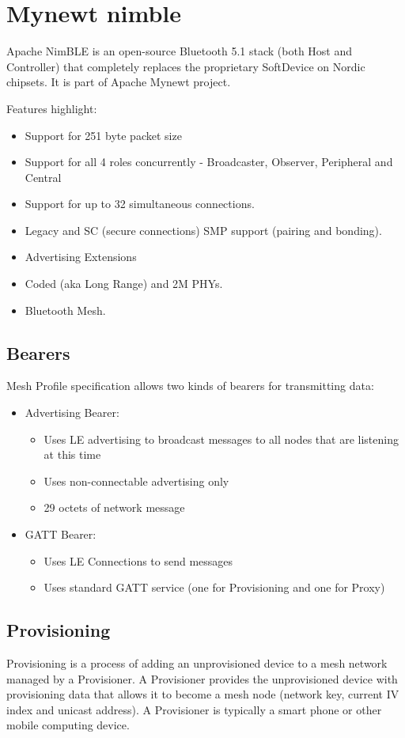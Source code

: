 \documentclass[\main/main.tex]{subfiles}
\begin{document}
\section{Mynewt nimble}
Apache NimBLE is an open-source Bluetooth 5.1 stack (both Host and Controller) that completely replaces the proprietary SoftDevice on Nordic chipsets. It is part of Apache Mynewt project.

Features highlight:
\begin{itemize}
    \item Support for 251 byte packet size
    \item Support for all 4 roles concurrently - Broadcaster, Observer, Peripheral and Central
    \item Support for up to 32 simultaneous connections.
    \item Legacy and SC (secure connections) SMP support (pairing and bonding).
    \item Advertising Extensions
    \item Coded (aka Long Range) and 2M PHYs.
    \item Bluetooth Mesh.
\end{itemize}

\subsection{Bearers}
Mesh Profile specification allows two kinds of bearers for transmitting data:

\begin{itemize}
    \item Advertising Bearer: \begin{itemize}
        \item Uses LE advertising to broadcast messages to all nodes that are listening at this time
        \item Uses non-connectable advertising only
        \item 29 octets of network message
    \end{itemize}
    \item GATT Bearer: \begin{itemize}
        \item Uses LE Connections to send messages
        \item Uses standard GATT service (one for Provisioning and one for Proxy)
    \end{itemize}
\end{itemize}

\subsection{Provisioning}
Provisioning is a process of adding an unprovisioned device to a mesh network managed by a Provisioner. A Provisioner provides the unprovisioned device with provisioning data that allows it to become a mesh node (network key, current IV index and unicast address). A Provisioner is typically a smart phone or other mobile computing device.
\end{document}
